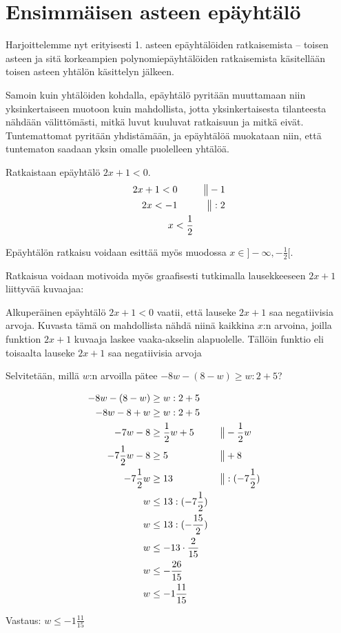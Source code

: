 \section{Ensimmäisen asteen epäyhtälö}

Harjoittelemme nyt erityisesti 1. asteen epäyhtälöiden ratkaisemista -- toisen asteen ja sitä korkeampien polynomiepäyhtälöiden ratkaisemista käsitellään toisen asteen yhtälön käsittelyn jälkeen.

Samoin kuin yhtälöiden kohdalla, epäyhtälö pyritään muuttamaan niin yksinkertaiseen muotoon kuin mahdollista, jotta yksinkertaisesta tilanteesta nähdään välittömästi, mitkä luvut kuuluvat ratkaisuun ja mitkä eivät. Tuntemattomat pyritään yhdistämään, ja epäyhtälöä muokataan niin, että tuntematon saadaan yksin omalle puolelleen yhtälöä.


\begin{esimerkki}
Ratkaistaan epäyhtälö $2x+1<0$.
\begin{align*}
2x+1<0 \ \ \ \ \ &&\big\| -1 \\
2x<-1 \ \ \ \ \ &&\big\| :2 \\
x<\-\frac{1}{2}
\end{align*}

Epäyhtälön ratkaisu voidaan esittää myös muodossa $x \in ]-\infty, -\frac{1}{2}[$.

Ratkaisua voidaan motivoida myös graafisesti tutkimalla lausekkeeseen $2x+1$ liittyvää kuvaajaa:

\begin{kuvaajapohja}{1}{-2}{2}{-2}{2}
\end{kuvaajapohja}

Alkuperäinen epäyhtälö $2x+1<0$ vaatii, että lauseke $2x+1$ saa negatiivisia arvoja. Kuvasta tämä on mahdollista nähdä niinä kaikkina $x$:n arvoina, joilla funktion $2x+1$ kuvaaja laskee vaaka-akselin alapuolelle. Tällöin funktio eli toisaalta lauseke $2x+1$ saa negatiivisia arvoja

\end{esimerkki}

\begin{esimerkki}Selvitetään, millä $w$:n arvoilla pätee $-8w-(8-w)\geq w:2+5$?

\begin{align*}
-8w-(8-w)&\geq w:2+5 \\
-8w-8+w&\geq w:2+5 \\
-7w-8&\geq \frac12 w+5  \ \ \ \ \ &&\big\| -\frac12 w \\
-7\frac12 w-8&\geq 5  \ \ \ \ \ &&\big\| +8 \\
-7\frac12 w&\geq 13  \ \ \ \ \ &&\big\| :(-7\frac12) \\
w&\leq 13:(-7\frac12) \\
w&\leq 13:(-\frac{15}{2}) \\
w&\leq -13\cdot \frac{2}{15} \\
w&\leq -\frac{26}{15} \\
w&\leq -1\frac{11}{15}
\end{align*}

Vastaus: $w\leq -1\frac{11}{15}$
\end{esimerkki}

